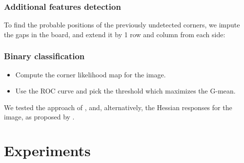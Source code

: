 \documentclass{beamer}
\begin{document}
\begin{frame}
	\frametitle{Additional features detection}
	To find the probable positions of the previously undetected corners, we
	impute the gaps in the board, and extend it by 1 row and column from each
	side:
	\begin{figure}
		\begin{subfigure}{0.45\linewidth}
		\end{subfigure}
		\begin{subfigure}{0.45\linewidth}
		\end{subfigure}
	\end{figure}
\end{frame}

\begin{frame}
	\frametitle{Binary classification}
	\begin{itemize}
		\item Compute the corner likelihood map for the image.
		\item Use the ROC curve and pick the threshold which maximizes the G-mean.
	\end{itemize}

	We tested the approach of \cite{geigerAutomaticCameraRange2012}, and,
	alternatively, the Hessian responses for the image, as proposed by
	\cite{chenNewSubPixelDetector2005}.
\end{frame}

\section{Experiments}\label{sec:experiments}
\end{document}

